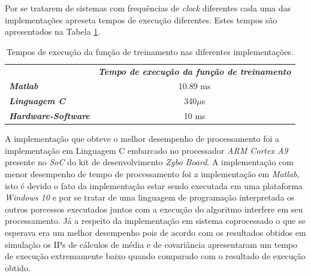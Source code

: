 Por se tratarem de sistemas com frequências de \textit{clock} diferentes cada uma das implementações apreseta tempos de execução diferentes. Estes tempos são apresentados na Tabela \ref{tempos}. 

\begin{table}[!h]
	\centering
	\caption{Tempos de execução da função de treinamento nas diferentes implementações.}
	\label{tempos}
	\begin{tabular}{lc}
		\rowcolor[HTML]{DAE8FC} 
		\multicolumn{1}{c}{\cellcolor[HTML]{DAE8FC}\textbf{Implementação}} & \textit{\textbf{Tempo de execução da função de treinamento}} \\
		\textit{\textbf{Matlab}}                                           & 10.89 ms                                                     \\
		\rowcolor[HTML]{DAE8FC} 
		\textit{\textbf{Linguagem C}}                                      & 340$\mu$s                                                 \\
		\textit{\textbf{Hardware-Software}}                                & 10 ms                                                       
	\end{tabular}
\end{table}

A implementação que obteve o melhor desempenho de processamento foi a implementação em Linguagem C embarcado no processador \textit{ARM Cortex A9} presente no \textit{SoC} do kit de desenvolvimento \textit{Zybo Board}. A implementação com menor desempenho de tempo de processamento foi a implementação em \textit{Matlab}, isto é devido o fato da implementação estar sendo executada em uma plataforma \textit{Windows 10} e por se tratar de uma linguagem de programação interpretada os outros porcessos executados juntos com a execução do algoritmo interfere em seu processamento. Já a respeito da implementação em sistema coprocessado o que se esperava era um melhor desempenho pois de acordo com os resultados obtidos em simulação os IPs de cálculos de média e de covariância apresentaram um tempo de execução extremamente baixo quando comparado com o resultado de execução obtido.
